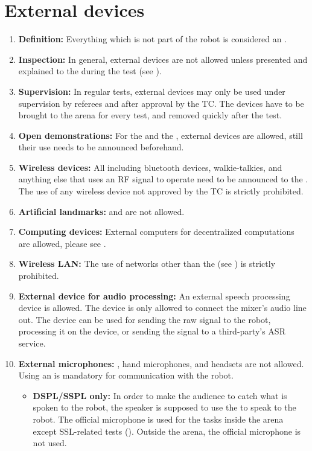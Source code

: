 \section{External devices}\label{rule:roobt_external_devices}
\begin{enumerate}
	\item \textbf{Definition:} Everything which is not part of the robot is considered an . 
	\item \textbf{Inspection:} In general, external devices are not allowed unless presented and explained to the  during the  test (see ).
	\item \textbf{Supervision:} In regular tests, external devices may only be used under supervision by referees and after approval by the TC. The devices have to be brought to the arena for every test, and removed quickly after the test.
	\item \textbf{Open demonstrations:} For the  and the , external devices are allowed, still their use needs to be announced beforehand.
	\item \textbf{Wireless devices:} All  including bluetooth devices, walkie-talkies, and anything else that uses an RF signal to operate need to be announced to the . The use of any wireless device not approved by the TC is strictly prohibited.  
	\item \textbf{Artificial landmarks:}  and  are not allowed.
	\item \textbf{Computing devices:} External computers for decentralized computations are allowed, please see .
	\item \textbf{Wireless LAN:} The use of networks other than the  (see ) is strictly prohibited.
	\item \textbf{External device for audio processing: }An external speech processing device is allowed. The device is only allowed to connect the mixer's audio line out. The device can be used for sending the raw signal to the robot, processing it on the device, or sending the signal to a third-party's ASR service.
	\item \textbf{External microphones: }, hand microphones, and headsets are not allowed. Using an  is mandatory for communication with the robot. 
	\begin{itemize}
	\item \textbf{DSPL/SSPL only: }In order to make the audience to catch what is spoken to the robot, the speaker is supposed to use the  to speak to the robot. The official microphone is used for the tasks inside the arena except SSL-related tests (). Outside the arena, the official microphone is not used.
	\end{itemize}
\end{enumerate}


